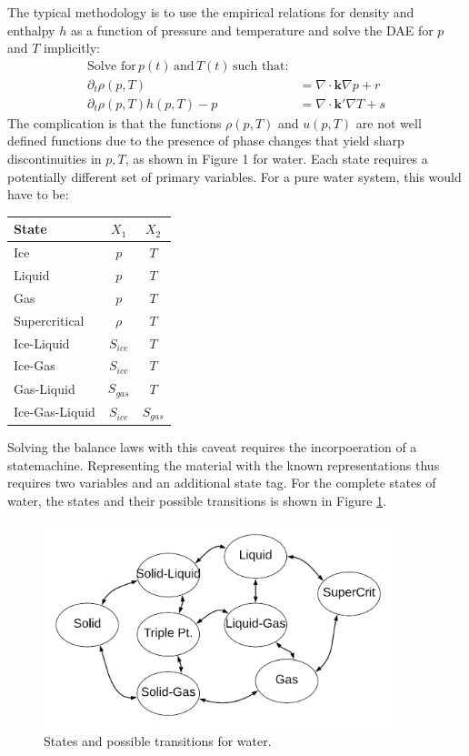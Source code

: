 \documentclass[]{article}
\begin{document}
The typical methodology is to use the empirical relations for density
and enthalpy \(h\) as a function of pressure and temperature and solve
the DAE for \(p\) and \(T\) implicitly:
\begin{align}
\text{Solve for}\, p(t)\, \text{and}\, T(t)\, \text{such that:}\\
\partial_t \rho(p,T) & = \nabla \cdot \mathbf{k}\nabla p + r\\
\partial_t \rho(p,T) h(p,T)-p & = \nabla \cdot \mathbf{k'}\nabla T + s
\end{align}
The complication is that the functions \(\rho(p,T)\) and \(u(p,T)\)
are not well defined functions due to the presence of phase changes that
yield sharp discontinuities in \(p,T\), as shown in Figure 1 for
water.
Each state requires a potentially different set of primary
variables. For a pure water system, this would have to be:
\begin{center}
\begin{tabular}{l|c|c}
  State & $X_1$ & $X_2$ \\
  \hline
  Ice & $p$ & $T$ \\
  Liquid & $p$ & $T$ \\
  Gas & $p$ & $T$ \\
  Supercritical & $\rho$ & $T$ \\
  Ice-Liquid & $S_{ice}$ & $T$ \\
  Ice-Gas & $S_{ice}$ & $T$ \\
  Gas-Liquid & $S_{gas}$ & $T$ \\
  Ice-Gas-Liquid & $S_{ice}$ & $S_{gas}$ 
\end{tabular}
\end{center}
Solving the balance laws with this caveat requires the incorpoeration
of a statemachine. Representing the material with the known
representations thus requires two variables and an additional state
tag. For the complete states of water, the states and their possible
transitions is shown in Figure \ref{fig:statemachine}.
  \begin{figure}
    \centering
    \includegraphics[width=4in]{../slides/phase_4.png}
    \caption{\label{fig:statemachine}States and possible transitions for water.}
\end{figure}
\end{document}
